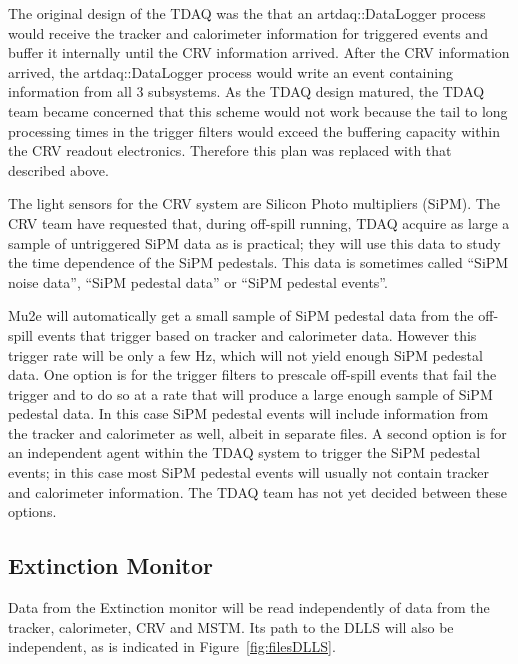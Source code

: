 \begin{sloppypar}
The original design of the TDAQ was the that an {\code artdaq::DataLogger} process
would receive the tracker and calorimeter information for triggered events
and buffer it internally until the CRV information arrived.
After the CRV information arrived,
the {\code artdaq::DataLogger} process would write an event containing information from all 3 subsystems.
As the TDAQ design matured, the TDAQ team became concerned that this scheme would not work because
the tail to long processing times in the trigger filters would exceed the buffering capacity within
the CRV readout electronics.
Therefore this plan was replaced with that described above.
\end{sloppypar}

The light sensors for the CRV system are Silicon Photo multipliers (SiPM).
The CRV team have requested that, during off-spill running,
TDAQ acquire as large a sample of untriggered SiPM data as is practical;
they will use this data to study the time dependence of the SiPM pedestals.
This data is sometimes called ``SiPM noise data'', ``SiPM pedestal data''
or ``SiPM pedestal events''.

Mu2e will automatically get a small sample of SiPM pedestal data from the off-spill events
that trigger based on tracker and calorimeter data.
However this trigger rate will be only a few Hz, which will not yield enough SiPM pedestal data.
One option is for the trigger filters to prescale off-spill events that fail the trigger
and to do so at a rate that will produce a large enough sample of SiPM pedestal data.
In this case SiPM pedestal events will include information from the tracker and calorimeter as well,
albeit in separate files.
A second option is for an independent agent within the TDAQ system to trigger the SiPM pedestal events;
in this case most SiPM pedestal events will usually not contain tracker and calorimeter information.
The TDAQ team has not yet decided between these options.


\subsection{Extinction Monitor}
\label{ssec:ExtMon}

Data from the Extinction monitor will be read independently of data
from the tracker, calorimeter, CRV and MSTM.
Its path to the DLLS will also be independent, as is indicated in Figure~\ref{fig:filesDLLS}.

